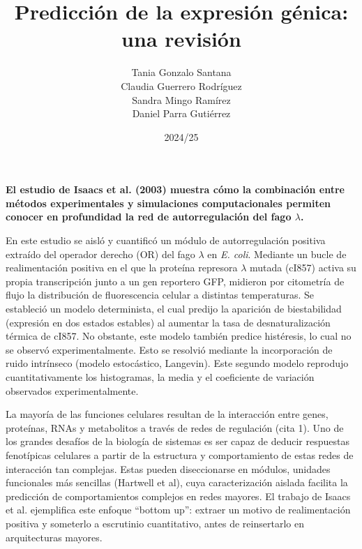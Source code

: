 \documentclass[nochap]{config/ejercicios}
\title{Predicción de la expresión génica: una revisión}
\author{Tania Gonzalo Santana \\ Claudia Guerrero Rodríguez \\ Sandra Mingo Ramírez \\ Daniel Parra Gutiérrez }
\date{2024/25}
\begin{document}
\maketitle

\large
\textbf{El estudio de Isaacs et al. (2003) muestra cómo la combinación entre métodos experimentales y simulaciones computacionales permiten conocer en profundidad la red de autorregulación del fago $\lambda$.}
\normalsize

En este estudio se aisló y cuantificó un módulo de autorregulación positiva extraído del operador derecho (OR) del fago $\lambda$ en \textit{E. coli}. Mediante un bucle de realimentación positiva en el que la proteína represora $\lambda$ mutada (cI857) activa su propia transcripción junto a un gen reportero GFP, midieron por citometría de flujo la distribución de fluorescencia celular a distintas temperaturas. Se estableció un modelo determinista, el cual predijo la aparición de biestabilidad (expresión en dos estados estables) al aumentar la tasa de desnaturalización térmica de cI857. No obstante, este modelo también predice histéresis, lo cual no se observó experimentalmente. Esto se resolvió mediante la incorporación de ruido intrínseco (modelo estocástico, Langevin). Este segundo modelo reprodujo cuantitativamente los histogramas, la media y el coeficiente de variación observados experimentalmente.

La mayoría de las funciones celulares resultan de la interacción entre genes, proteínas, RNAs y metabolitos a través de redes de regulación (cita 1). Uno de los grandes desafíos de la biología de sistemas es ser capaz de deducir respuestas fenotípicas celulares a partir de la estructura y comportamiento de estas redes de interacción tan complejas. Estas pueden diseccionarse en módulos, unidades funcionales más sencillas (Hartwell et al), cuya caracterización aislada facilita la predicción de comportamientos complejos en redes mayores. El trabajo de Isaacs et al. ejemplifica este enfoque “bottom up”: extraer un motivo de realimentación positiva y someterlo a escrutinio cuantitativo, antes de reinsertarlo en arquitecturas mayores.
\end{document}
